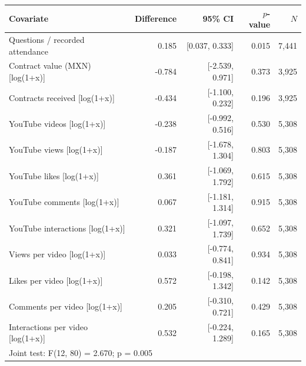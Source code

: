 \begin{tabular}{lrrrr}
\toprule
Covariate & Difference & 95\% CI & $p$-value & $N$ \\
\midrule
Questions / recorded attendance & 0.185 & [0.037, 0.333] & 0.015 & 7,441 \\
Contract value (MXN) [log(1+x)] & -0.784 & [-2.539, 0.971] & 0.373 & 3,925 \\
Contracts received [log(1+x)] & -0.434 & [-1.100, 0.232] & 0.196 & 3,925 \\
YouTube videos [log(1+x)] & -0.238 & [-0.992, 0.516] & 0.530 & 5,308 \\
YouTube views [log(1+x)] & -0.187 & [-1.678, 1.304] & 0.803 & 5,308 \\
YouTube likes [log(1+x)] & 0.361 & [-1.069, 1.792] & 0.615 & 5,308 \\
YouTube comments [log(1+x)] & 0.067 & [-1.181, 1.314] & 0.915 & 5,308 \\
YouTube interactions [log(1+x)] & 0.321 & [-1.097, 1.739] & 0.652 & 5,308 \\
Views per video [log(1+x)] & 0.033 & [-0.774, 0.841] & 0.934 & 5,308 \\
Likes per video [log(1+x)] & 0.572 & [-0.198, 1.342] & 0.142 & 5,308 \\
Comments per video [log(1+x)] & 0.205 & [-0.310, 0.721] & 0.429 & 5,308 \\
Interactions per video [log(1+x)] & 0.532 & [-0.224, 1.289] & 0.165 & 5,308 \\
\midrule
\multicolumn{5}{l}{Joint test: F(12, 80) = 2.670; p = 0.005} \\
\bottomrule
\end{tabular}
